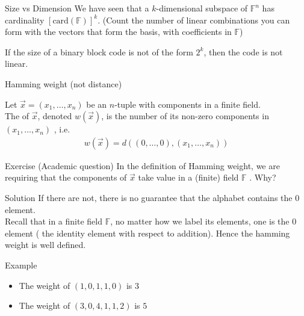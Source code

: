 \begin{parag}{Size vs Dimension}
    We have seen that a $k$-dimensional subspace of $\mathbb{F}^n$ has cardinality $\left[\text{card}\left(\mathbb{F}\right)\right]^k$. (Count the number of linear combinations you can form with the vectors that form the basis, with coefficients in $\mathbb{F}$)
    \begin{framedremark}
        If the size of a binary block code is not of the form $2^k$, then the code is not linear.
    \end{framedremark}
\end{parag}

\begin{parag}{Hamming weight (not distance)}
    \begin{definition}
    Let $\vec{x} =  \left(x_1, \ldots, x_n\right)$ be an $n$-tuple with components in a finite field.\\
    The  of $\vec{x}$, denoted $w\left(\vec{x}\right)$, is the number of its non-zero components in $\left(x_1, \ldots, x_n\right)$ , i.e.
    \begin{align*} w\left(\vec{x}\right) = d\left(\left(0, \ldots, 0\right), \left(x_1, \ldots, x_n\right)\right) \end{align*}
    \end{definition}
    
\end{parag}
\begin{parag}{Exercise (Academic question)}
    In the definition of Hamming weight, we are requiring that the components of $\vec{x}$ take value in a (finite) field $\mathbb{F}$ . Why?
    \begin{subparag}{Solution}
       If there are not, there is no guarantee that the alphabet contains the $0$ element.\\
       Recall that in a finite field $\mathbb{F}$, no matter how we label its elements, one is the 0 element ( the identity element with respect to addition). Hence the hamming weight is well defined. 
    \end{subparag}
    \begin{subparag}{Example}
        \begin{itemize}
        \item The weight of $\left(1, 0, 1, 1, 0\right)$ is $3$ 
        \item The weight of $\left(3, 0, 4, 1, 1, 2\right)$ is $5$
        \end{itemize}
    \end{subparag}
\end{parag}
